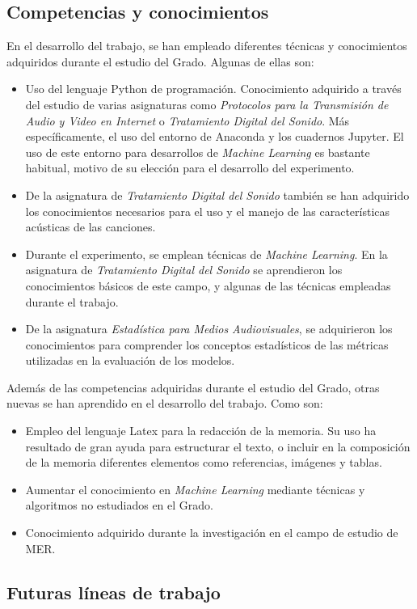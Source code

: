 \documentclass[12pt,a4paper]{article}
\begin{document}
\subsection{Competencias y conocimientos}
En el desarrollo del trabajo, se han empleado diferentes técnicas y conocimientos adquiridos durante el estudio del Grado. Algunas de ellas son:
\begin{itemize}
	\item Uso del lenguaje Python de programación. Conocimiento adquirido a través del estudio de varias asignaturas como \textit{Protocolos para la Transmisión de Audio y Video en Internet} o \textit{Tratamiento Digital del Sonido}. Más específicamente, el uso del entorno de Anaconda y los cuadernos Jupyter. El uso de este entorno para desarrollos de \textit{Machine Learning} es bastante habitual, motivo de su elección para el desarrollo del experimento.
	\item De la asignatura de \textit{Tratamiento Digital del Sonido} también se han adquirido los conocimientos necesarios para el uso y el manejo de las características acústicas de las canciones.
	\item Durante el experimento, se emplean técnicas de \textit{Machine Learning}. En la asignatura de \textit{Tratamiento Digital del Sonido} se aprendieron los conocimientos básicos de este campo, y algunas de las técnicas empleadas durante el trabajo.
	\item De la asignatura \textit{Estadística para Medios Audiovisuales}, se adquirieron los conocimientos para comprender los conceptos estadísticos de las métricas utilizadas en la evaluación de los modelos.
\end{itemize}

Además de las competencias adquiridas durante el estudio del Grado, otras nuevas se han aprendido en el desarrollo del trabajo. Como son:
\begin{itemize}
	\item Empleo del lenguaje Latex para la redacción de la memoria. Su uso ha resultado de gran ayuda para estructurar el texto, o incluir en la composición de la memoria diferentes elementos como referencias, imágenes y tablas.
	\item Aumentar el conocimiento en \textit{Machine Learning} mediante técnicas y algoritmos no estudiados en el Grado.
	\item Conocimiento adquirido durante la investigación en el campo de estudio de MER.
\end{itemize}
\subsection{Futuras líneas de trabajo}
\end{document}
